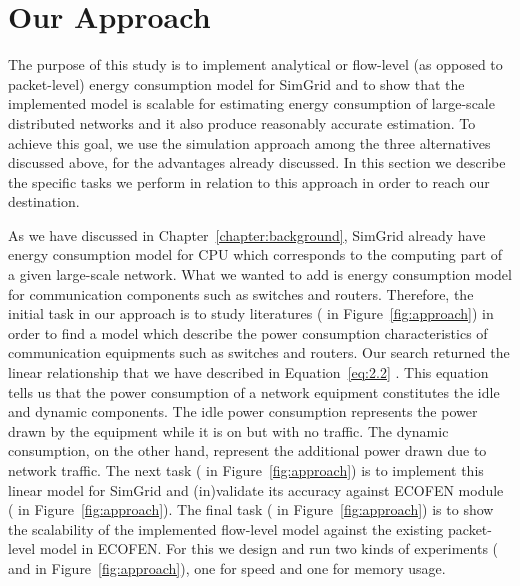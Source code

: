 \section{Our Approach}
\label{section:ourapproach}
The purpose of this study is to implement analytical or flow-level (as opposed to packet-level) energy consumption model for SimGrid and to show that the implemented model is scalable for estimating energy consumption of large-scale distributed networks and it also produce reasonably accurate estimation. To achieve this goal, we use the simulation approach among the three alternatives discussed above, for the advantages already discussed. In this section we describe the specific tasks we perform in relation to this approach in order to reach our destination.

As we have discussed in Chapter~\ref{chapter:background}, SimGrid already have energy consumption model for CPU which corresponds to the computing part of a given large-scale network. What we wanted to add is energy consumption model for communication components such as switches and routers. Therefore, the initial task in our approach is to study literatures ( in Figure~\ref{fig:approach}) in order to find a model which describe the power consumption characteristics of communication equipments such as switches and routers. Our search returned the linear relationship that we have described in Equation~\ref{eq:2.2} \cite{Sivaraman,DBLP:journals/comcom/BeisterDAK14,DBLP:conf/networking/MahadevanSBR09,DBLP:conf/sigcomm/MahadevanBS10}. This equation tells us that the power consumption of a network equipment constitutes the idle and dynamic components. The idle power consumption represents the power drawn by the equipment while it is on but with no traffic. The dynamic consumption, on the other hand, represent the additional power drawn due to network traffic. The next task ( in Figure~\ref{fig:approach}) is to implement this linear model for SimGrid and (in)validate its accuracy against ECOFEN module ( in Figure~\ref{fig:approach})\cite{DBLP:conf/wowmom/OrgerieLLL11,DBLP:conf/cloudnet/CorneaOL14}. The final task ( in Figure~\ref{fig:approach}) is to show the scalability of the implemented flow-level model against the existing packet-level model in ECOFEN. For this we design and run two kinds of experiments ( and  in Figure~\ref{fig:approach}), one for speed and one for memory usage. 

